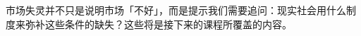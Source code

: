 \documentclass[UTF8,10pt,a4paper,scheme=chinese,fontset=none]{ctexart}
\begin{document}

市场失灵并不只是说明市场「不好」，而是提示我们需要追问：现实社会用什么制度来弥补这些条件的缺失？这些将是接下来的课程所覆盖的内容。




\end{document}
